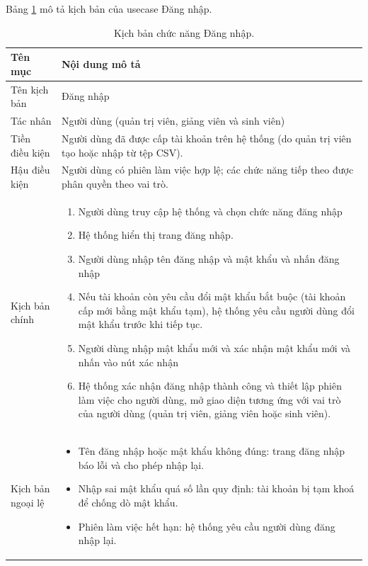 \documentclass[../BTL.tex]{subfiles}
\begin{document}
Bảng \ref{tab:uc-dang-nhap} mô tả kịch bản của usecase Đăng nhập.
\begin{table}[H]
\centering
\begin{tabularx}{\textwidth}{|p{3.2cm}|X|}
\hline
Tên mục & Nội dung mô tả \\ \hline
Tên kịch bản & Đăng nhập \\ \hline
Tác nhân & Người dùng (quản trị viên, giảng viên và sinh viên) \\ \hline
Tiền điều kiện & Người dùng đã được cấp tài khoản trên hệ thống (do quản trị viên tạo hoặc nhập từ tệp CSV). \\ \hline
Hậu điều kiện & Người dùng có phiên làm việc hợp lệ; các chức năng tiếp theo được phân quyền theo vai trò. \\ \hline
Kịch bản chính &
\begin{enumerate}[leftmargin=*, nosep]
    \item Người dùng truy cập hệ thống và chọn chức năng đăng nhập
    \item Hệ thống hiển thị trang đăng nhập.
    \item Người dùng nhập tên đăng nhập và mật khẩu và nhấn đăng nhập
    \item Nếu tài khoản còn yêu cầu đổi mật khẩu bắt buộc (tài khoản cấp mới bằng mật khẩu tạm), hệ thống yêu cầu người dùng đổi mật khẩu trước khi tiếp tục.
    \item Người dùng nhập mật khẩu mới và xác nhận mật khẩu mới và nhấn vào nút xác nhận
    \item Hệ thống xác nhận đăng nhập thành công và thiết lập phiên làm việc cho người dùng, mở giao diện tương ứng với vai trò của người dùng (quản trị viên, giảng viên hoặc sinh viên).
\end{enumerate} \\ \hline
Kịch bản ngoại lệ &
\begin{itemize}[leftmargin=*, nosep]
    \item Tên đăng nhập hoặc mật khẩu không đúng: trang đăng nhập báo lỗi và cho phép nhập lại.
    \item Nhập sai mật khẩu quá số lần quy định: tài khoản bị tạm khoá để chống dò mật khẩu.
    \item Phiên làm việc hết hạn: hệ thống yêu cầu người dùng đăng nhập lại.
\end{itemize} \\ \hline
\end{tabularx}
\caption{Kịch bản chức năng Đăng nhập.}
\label{tab:uc-dang-nhap}
\end{table}
\end{document}
